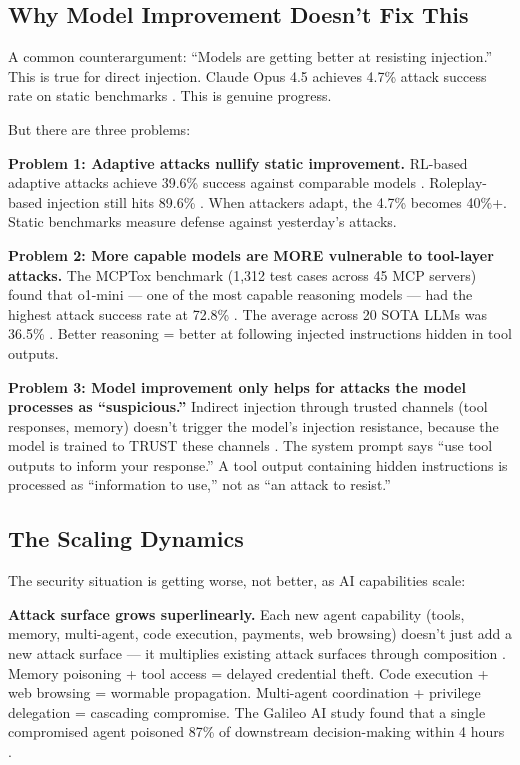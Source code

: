 \documentclass[11pt,letterpaper]{article}
\begin{document}
\subsection{Why Model Improvement Doesn't Fix This}

A common counterargument: ``Models are getting better at resisting injection.'' This is true for direct injection. Claude Opus 4.5 achieves 4.7\% attack success rate on static benchmarks \cite{grayswan}. This is genuine progress.

But there are three problems:

\textbf{Problem 1: Adaptive attacks nullify static improvement.} RL-based adaptive attacks achieve 39.6\% success against comparable models \cite{rlinject}. Roleplay-based injection still hits 89.6\% \cite{rlinject}. When attackers adapt, the 4.7\% becomes 40\%+. Static benchmarks measure defense against yesterday's attacks.

\textbf{Problem 2: More capable models are MORE vulnerable to tool-layer attacks.} The MCPTox benchmark (1,312 test cases across 45 MCP servers) found that o1-mini --- one of the most capable reasoning models --- had the highest attack success rate at 72.8\% \cite{mcptoxbench}. The average across 20 SOTA LLMs was 36.5\% \cite{mcptoxbench}. Better reasoning = better at following injected instructions hidden in tool outputs.

\textbf{Problem 3: Model improvement only helps for attacks the model processes as ``suspicious.''} Indirect injection through trusted channels (tool responses, memory) doesn't trigger the model's injection resistance, because the model is trained to TRUST these channels \cite{kim2026,chhabra2025}. The system prompt says ``use tool outputs to inform your response.'' A tool output containing hidden instructions is processed as ``information to use,'' not as ``an attack to resist.''


\subsection{The Scaling Dynamics}

The security situation is getting worse, not better, as AI capabilities scale:

\textbf{Attack surface grows superlinearly.} Each new agent capability (tools, memory, multi-agent, code execution, payments, web browsing) doesn't just add a new attack surface --- it multiplies existing attack surfaces through composition \cite{kim2026,securitymodeling}. Memory poisoning + tool access = delayed credential theft. Code execution + web browsing = wormable propagation. Multi-agent coordination + privilege delegation = cascading compromise. The Galileo AI study found that a single compromised agent poisoned 87\% of downstream decision-making within 4 hours \cite{galileo}.
\end{document}
